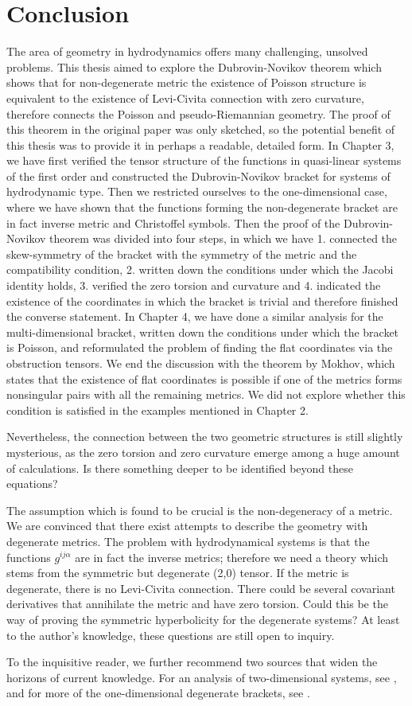 \chapter*{Conclusion}

The area of geometry in hydrodynamics offers many challenging, unsolved problems. This thesis aimed to explore the Dubrovin-Novikov theorem which shows that for non-degenerate metric the existence of Poisson structure is equivalent to the existence of Levi-Civita connection with zero curvature, therefore connects the Poisson and pseudo-Riemannian geometry. The proof of this theorem in the original paper \cite{Dubrovin-Novikov} was only sketched, so the potential benefit of this thesis was to provide it in perhaps a readable, detailed form. In Chapter 3, we have first verified the tensor structure of the functions in quasi-linear systems of the first order and constructed the Dubrovin-Novikov bracket for systems of hydrodynamic type. Then we restricted ourselves to the one-dimensional case, where we have shown that the functions forming the non-degenerate bracket are in fact inverse metric and Christoffel symbols. Then the proof of the Dubrovin-Novikov theorem was divided into four steps, in which we have 1. connected the skew-symmetry of the bracket with the symmetry of the metric and the compatibility condition, 2. written down the conditions under which the Jacobi identity holds, 3. verified the zero torsion and curvature and 4. indicated the existence of the coordinates in which the bracket is trivial and therefore finished the converse statement. In Chapter 4, we have done a similar analysis for the multi-dimensional bracket, written down the conditions under which the bracket is Poisson, and reformulated the problem of finding the flat coordinates via the obstruction tensors. We end the discussion with the theorem by Mokhov, which states that the existence of flat coordinates is possible if one of the metrics forms nonsingular pairs with all the remaining metrics. We did not explore whether this condition is satisfied in the examples mentioned in Chapter 2.


Nevertheless, the connection between the two geometric structures is still slightly mysterious, as the zero torsion and zero curvature emerge among a huge amount of calculations. Is there something deeper to be identified beyond these equations? 

The assumption which is found to be crucial is the non-degeneracy of a metric. We are convinced that there exist attempts to describe the geometry with degenerate metrics. The problem with hydrodynamical systems is that the functions $g^{ij \alpha}$ are in fact the inverse metrics; therefore we need a theory which stems from the symmetric but degenerate (2,0) tensor. If the metric is degenerate, there is no Levi-Civita connection. There could be several covariant derivatives that annihilate the metric and have zero torsion. Could this be the way of proving the symmetric hyperbolicity for the degenerate systems? At least to the author's knowledge, these questions are still open to inquiry. 

To the inquisitive reader, we further recommend two sources that widen the horizons of current knowledge. For an analysis of two-dimensional systems, see \cite{Savoldi}, and for more of the one-dimensional degenerate brackets, see \cite{savoldi2014deformations}. 
